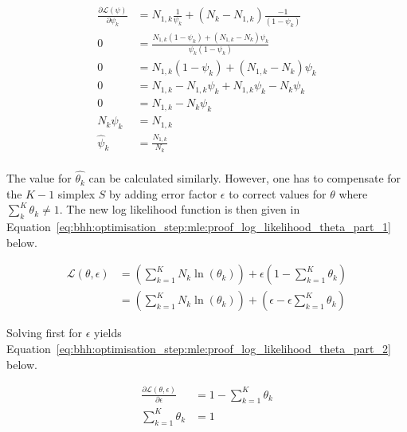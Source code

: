 \begin{equation}
      \label{eq:bhh:optimisation_step:mle:proof_log_likelihood_psi}
      \begin{split}
            \frac{\partial \mathcal{L}(\psi)}{\partial \psi_{k}} &= N_{1,k} \frac{1}{ \psi_{k}} + \left( N_{k} - N_{1,k} \right) \frac{-1}{ \left( 1 - \psi_{k} \right) } \\
            0 &=  \frac{ N_{1,k} \left( 1 - \psi_{k} \right) +  \left( N_{1,k} - N_{k} \right) \psi_{k}}{ \psi_{k} \left( 1 - \psi_{k} \right) } \\
            0 &=  N_{1,k} \left( 1 - \psi_{k} \right) +  \left( N_{1,k} - N_{k} \right) \psi_{k} \\
            0 &=  N_{1,k} - N_{1,k} \psi_{k}  +  N_{1,k} \psi_{k} - N_{k}\psi_{k} \\
            0 &=  N_{1,k} - N_{k}\psi_{k} \\
            N_{k}\psi_{k} &=  N_{1,k} \\
            \hat{\psi}_{k} &=  \frac{N_{1,k}}{N_{k}} \\
      \end{split}
\end{equation}


The value for $\hat{\theta_{k}} $ can be calculated similarly. However, one has to compensate for the $K-1$ simplex $S$ by adding error factor $\epsilon$ to correct values for  $\theta$ where $\sum_{k}^{K} \theta_{k} \neq 1$. The new log likelihood function is then given in Equation~\eqref{eq:bhh:optimisation_step:mle:proof_log_likelihood_theta_part_1} below.

\begin{equation}
      \label{eq:bhh:optimisation_step:mle:proof_log_likelihood_theta_part_1}
      \begin{split}
            \mathcal{L}(\theta, \epsilon)
            &=  \left( \sum_{k=1}^{K} N_{k} \ln \left( \theta_{k} \right) \right) + \epsilon \left( 1 - \sum_{k=1}^{K} \theta_{k} \right) \\
            &=  \left( \sum_{k=1}^{K} N_{k} \ln \left( \theta_{k} \right) \right) + \left( \epsilon -  \epsilon \sum_{k=1}^{K} \theta_{k} \right)
      \end{split}
\end{equation}

Solving first for $\epsilon$ yields Equation~\eqref{eq:bhh:optimisation_step:mle:proof_log_likelihood_theta_part_2} below.

\begin{equation}
      \label{eq:bhh:optimisation_step:mle:proof_log_likelihood_theta_part_2}
      \begin{split}
            \frac{\partial \mathcal{L}(\theta, \epsilon)}{\partial \epsilon} &= 1 - \sum_{k=1}^{K} \theta_{k}  \\
            \sum_{k=1}^{K} \theta_{k}  &= 1
      \end{split}
\end{equation}

